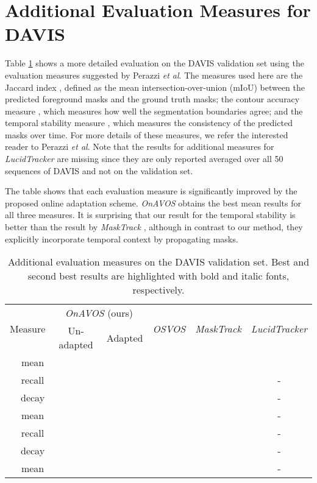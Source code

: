 \documentclass{bmvc2k}
\newcommand{\methodname}[1]{\mbox{\emph{#1}}}
\def\etal{\emph{et al}\bmvaOneDot}
\begin{document}
\section{Additional Evaluation Measures for DAVIS}
Table \ref{tab:measures} shows a more detailed evaluation on the DAVIS validation set using the evaluation measures suggested by Perazzi \etal \cite{DAVIS2016}. The measures used here are the Jaccard index , defined as the mean intersection-over-union (mIoU) between the predicted foreground masks and the ground truth masks; the contour accuracy measure , which measures how well the segmentation boundaries agree; and the temporal stability measure , which measures the consistency of the predicted masks over time. For more details of these measures, we refer the interested reader to Perazzi \etal \cite{DAVIS2016}. Note that the results for additional measures for \methodname{LucidTracker} \cite{lucidtracker} are missing since they are only reported averaged over all 50 sequences of DAVIS and not on the validation set.

The table shows that each evaluation measure is significantly improved by the proposed online adaptation scheme. \methodname{OnAVOS} obtains the best mean results for all three measures. It is surprising that our result for the temporal stability  is better than the result by \methodname{MaskTrack} \cite{masktrack}, although in contrast to our method, they explicitly incorporate temporal context by propagating masks.


\begin{table}[h]
\footnotesize
\begin{center}
\begin{tabular}{|cc|c|c|c|c|c|}
\hline 
\multicolumn{2}{|c}{\multirow{2}{*}{Measure}} & \multicolumn{2}{|c|}{\methodname{OnAVOS} (ours)} & \multirow{2}{*}{\methodname{OSVOS} \cite{OSVOS}} & \multirow{2}{*}{\methodname{MaskTrack} \cite{masktrack}} & \multirow{2}{*}{\methodname{LucidTracker} \cite{lucidtracker}}\tabularnewline
\cline{3-4} 
 &  & Un-adapted & Adapted &  &  & \tabularnewline
\hline 
\hline 
\multirow{3}{*}{} & mean  &  &  &  &  & \tabularnewline
 & recall  &  &  &  &  & - \tabularnewline
 & decay  &  &  &  &  & - \tabularnewline
\hline 
\multirow{3}{*}{} & mean  &  &  &  &  & - \tabularnewline
 & recall  &  &  &  &  & - \tabularnewline
 & decay  &  &  &  &  & - \tabularnewline
\hline 
 & mean  &  &  &  &  & - \tabularnewline
\hline 
\end{tabular}
\end{center}

\caption{\label{tab:measures}Additional evaluation measures on the DAVIS validation set. Best and second best results are highlighted with bold and italic fonts, respectively.}
\end{table}
\end{document}
